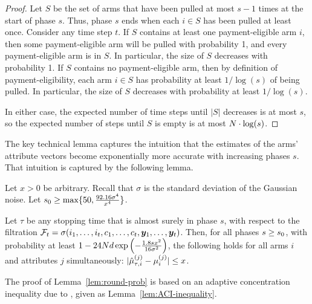 \begin{proof}
Let $S$ be the set of arms that have been pulled at most
$s-1$ times at the start of phase $s$.
Thus, phase $s$ ends when each $i \in S$ has been pulled at least once.
Consider any time step $t$.
If $S$ contains at least one payment-eligible arm $i$,
then some payment-eligible arm will be pulled with probability 1,
and every payment-eligible arm is in $S$.
In particular, the size of $S$ decreases with probability 1.
If $S$ contains no payment-eligible arm,
then by definition of payment-eligibility,
each arm $i \in S$ has probability at least $1/\log(s)$ of being pulled.
In particular, the size of $S$ decreases with probability at least $1/\log(s)$.

In either case, the expected number of time steps until
$|S|$ decreases is at most $s$,
so the expected number of steps until $S$ is empty is at most
$N \cdot \log(s)$.
\end{proof}
                  
The key technical lemma captures the intuition that
the estimates of the arms' attribute vectors become
exponentially more accurate with increasing phases $s$.
That intuition is captured by the following lemma.

\begin{lemma} \label{lem:round-prob}
Let $x > 0$ be arbitrary.
Recall that $\sigma$ is the standard deviation of the Gaussian noise.
Let $s_0 \geq \max \{ 50, \frac{92.16 \sigma^4}{x^4} \}$.

Let $\tau$ be any stopping time that is almost surely  in phase $s$,
with respect to the filtration
$\mathcal{F}_{t} = \sigma (i_{1}, \ldots, i_{t},
                          c_{1}, \ldots, c_{t},
                          \bm{y}_{1}, \ldots, \bm{y}_{t})$.
Then, for all phases $s \geq s_0$,
with probability at least 
$1- 24 N d \exp\left(-\frac{1.8 s x^2}{16 \sigma^2} \right)$,
the following holds for all arms $i$ and attributes $j$
simultaneously:
$|\hat{\mu}_{\tau,i}^{(j)} - \mu_{i}^{(j)}| \leq x$.
\end{lemma}

The proof of Lemma~\ref{lem:round-prob} is based on an adaptive
concentration inequality due to \cite{zhao2016adaptive},
given as Lemma~\ref{lem:ACI-inequality}.

